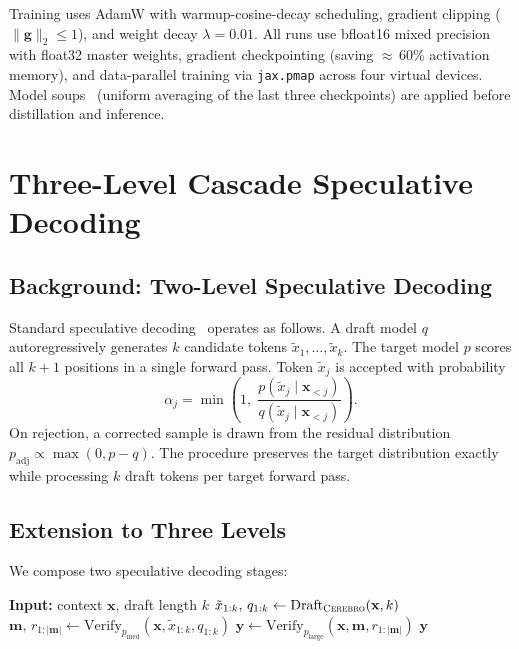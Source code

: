 \documentclass[11pt,a4paper]{article}
\newcommand{\cerebro}{\textsc{Cerebro}}
\newcommand{\plarge}{p_{\mathrm{large}}}
\newcommand{\pmed}{p_{\mathrm{med}}}
\begin{document}
Training uses AdamW with warmup-cosine-decay scheduling, gradient clipping
($\|\mathbf{g}\|_2 \le 1$), and weight decay $\lambda=0.01$. All runs use
bfloat16 mixed precision with float32 master weights, gradient checkpointing
(saving $\approx$\,60\% activation memory), and data-parallel training via
\texttt{jax.pmap} across four virtual devices. Model soups~\citep{wortsman2022model}
(uniform averaging of the last three checkpoints) are applied before distillation
and inference.

\section{Three-Level Cascade Speculative Decoding}
\label{sec:cascade}

\subsection{Background: Two-Level Speculative Decoding}

Standard speculative decoding~\citep{leviathan2023fast} operates as follows.
A draft model $q$ autoregressively generates $k$ candidate tokens
$\tilde{x}_1,\ldots,\tilde{x}_k$. The target model $p$ scores all $k+1$
positions in a single forward pass. Token $\tilde{x}_j$ is accepted with
probability
\[
  \alpha_j = \min\!\left(1,\; \frac{p(\tilde{x}_j \mid \mathbf{x}_{<j})}
                                    {q(\tilde{x}_j \mid \mathbf{x}_{<j})}\right).
\]
On rejection, a corrected sample is drawn from the residual distribution
$p_{\mathrm{adj}} \propto \max(0, p - q)$. The procedure preserves the target
distribution exactly while processing $k$ draft tokens per target forward pass.

\subsection{Extension to Three Levels}

We compose two speculative decoding stages:

\medskip
\begin{algorithmic}[1]
\State \textbf{Input:} context $\mathbf{x}$, draft length $k$
\State $\tilde{x}_{1:k},\, q_{1:k} \gets \mathrm{Draft}_{\cerebro{}}(\mathbf{x}, k)$
  \Comment{Level 1: \cerebro{} drafts $k$ tokens}
\State $\mathbf{m},\, r_{1:|\mathbf{m}|} \gets \mathrm{Verify}_{\pmed}(\mathbf{x},
  \tilde{x}_{1:k}, q_{1:k})$
\State $\mathbf{y} \gets \mathrm{Verify}_{\plarge}(\mathbf{x}, \mathbf{m},
  r_{1:|\mathbf{m}|})$
\State \Return $\mathbf{y}$
\end{algorithmic}
\medskip
\end{document}
